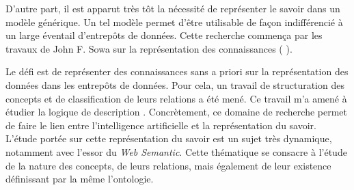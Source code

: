 \begin{refsegment}

D'autre part, il est apparut très tôt la nécessité de représenter le savoir dans un modèle générique. Un tel modèle permet d'être utilisable de façon indifférencié à un large éventail d'entrepôts de données. Cette recherche commença par les travaux de John F. Sowa sur la représentation des connaissances ( \citeyear{sowa92,sowa99}).

Le défi est de représenter des connaissances sans a priori sur la représentation des données dans les entrepôts de données. Pour cela, un travail de structuration des concepts et de classification de leurs relations a été mené. Ce travail m'a amené à étudier la logique de description \cite{baader2003description}. Concrètement, ce domaine de recherche permet de faire le lien entre l'intelligence artificielle et la représentation du savoir. L'étude portée sur cette représentation du savoir est un sujet très dynamique, notamment avec l'essor du \textit{Web Semantic}. Cette thématique se consacre à l'étude de la nature des concepts, de leurs relations, mais également de leur existence définissant par la même l'ontologie.


\end{refsegment}
